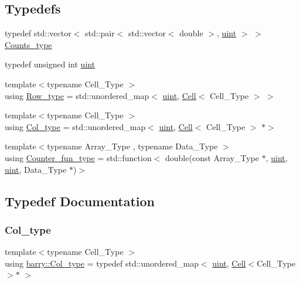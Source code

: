 \subsection*{Typedefs}
\begin{DoxyCompactItemize}
\item 
typedef std\+::vector$<$ std\+::pair$<$ std\+::vector$<$ double $>$, \hyperlink{namespacebarry_a11dfc53ddb4672278319aa04f1e09a6c}{uint} $>$ $>$ \hyperlink{namespacebarry_a3e2d8c3b6cf602107559d4237d9f1315}{Counts\+\_\+type}
\item 
typedef unsigned int \hyperlink{namespacebarry_a11dfc53ddb4672278319aa04f1e09a6c}{uint}
\item 
{\footnotesize template$<$typename Cell\+\_\+\+Type $>$ }\\using \hyperlink{namespacebarry_a8f67f2e1e26f3cb10d240b7e1a1d917c}{Row\+\_\+type} = std\+::unordered\+\_\+map$<$ \hyperlink{namespacebarry_a11dfc53ddb4672278319aa04f1e09a6c}{uint}, \hyperlink{classbarry_1_1_cell}{Cell}$<$ Cell\+\_\+\+Type $>$ $>$
\item 
{\footnotesize template$<$typename Cell\+\_\+\+Type $>$ }\\using \hyperlink{namespacebarry_adc551002e63e38057d304f78d7756308}{Col\+\_\+type} = std\+::unordered\+\_\+map$<$ \hyperlink{namespacebarry_a11dfc53ddb4672278319aa04f1e09a6c}{uint}, \hyperlink{classbarry_1_1_cell}{Cell}$<$ Cell\+\_\+\+Type $>$ $\ast$$>$
\item 
{\footnotesize template$<$typename Array\+\_\+\+Type , typename Data\+\_\+\+Type $>$ }\\using \hyperlink{namespacebarry_abaaae3200da8e4b7faac3c04fe9c3081}{Counter\+\_\+fun\+\_\+type} = std\+::function$<$ double(const Array\+\_\+\+Type $\ast$, \hyperlink{namespacebarry_a11dfc53ddb4672278319aa04f1e09a6c}{uint}, \hyperlink{namespacebarry_a11dfc53ddb4672278319aa04f1e09a6c}{uint}, Data\+\_\+\+Type $\ast$)$>$
\end{DoxyCompactItemize}


\subsection{Typedef Documentation}
\mbox{\label{namespacebarry_adc551002e63e38057d304f78d7756308}} 
\subsubsection{\texorpdfstring{Col\+\_\+type}{Col\_type}}
{\footnotesize\ttfamily template$<$typename Cell\+\_\+\+Type $>$ \\
using \hyperlink{namespacebarry_adc551002e63e38057d304f78d7756308}{barry\+::\+Col\+\_\+type} = typedef std\+::unordered\+\_\+map$<$ \hyperlink{namespacebarry_a11dfc53ddb4672278319aa04f1e09a6c}{uint}, \hyperlink{classbarry_1_1_cell}{Cell}$<$Cell\+\_\+\+Type$>$$\ast$ $>$}




